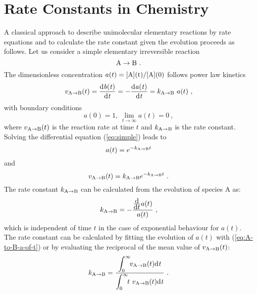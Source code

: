 \section{Rate Constants in Chemistry}

A classical approach to describe unimolecular elementary reactions by rate equations and to calculate the rate constant given the evolution proceeds as follows.
Let us consider a simple elementary irreversible reaction 
\begin{equation}
\label{eq:A-to-B}
{\centering
\rm A \rightarrow B} ~.
\end{equation}
The dimensionless concentration $a(t) = \rm[A](t) / \rm[A](0)$ follows power law kinetics
\begin{equation}
\label{eq:simple}
v_{\rm A \rightarrow B}(t) = \frac{\rm d \it b (t)}{\rm d \it t}
= - \frac{\rm d \it a (t)}{\rm d \it t} =  k_{\rm A \rightarrow B} ~ a(t) ~,
\end{equation}
with boundary conditions
\begin{equation}
a(0) = 1 , ~ \lim_{t \rightarrow \infty} a(t) = 0 ~,
\end{equation}
where $v_{\rm A \rightarrow B}(t)$ is the reaction rate at time $t$ and $k_{\rm A \rightarrow B}$ is the rate constant.
Solving the differential equation (\ref{eq:simple}) leads to 
\begin{equation}
\label{eq:A-to-B-a-of-t}
a(t) = e^{- k_{\rm A \rightarrow B} t}
\end{equation}
and 
\begin{equation}
\label{eq:v}
v_{\rm A \rightarrow B}(t) = k_{\rm A \rightarrow B} e^{- k_{\rm A \rightarrow B} t} ~.
\end{equation}
The rate constant $k_{\rm A \rightarrow B}$ can be calculated from the evolution of species A as:
\begin{equation}
\label{eq:diff-A-to-B}
k_{\rm A \rightarrow B} = 
- \frac{\frac{\displaystyle \rm d}{\displaystyle{{\rm d} t}} {\displaystyle{a(t)}}}{a(t)} ~,
\end{equation}
which is independent of time $t$ in the case of exponential behaviour for $a(t)$.
The rate constant can be calculated by fitting the evolution of $a(t)$ with (\ref{eq:A-to-B-a-of-t}) or by evaluating the reciprocal of the mean value of $v_{\rm A \rightarrow B}(t)$:
\begin{equation}
\label{eq:int-A-to-B}
k_{\rm A \rightarrow B} = \frac{\displaystyle{\int_0^{\infty}  \!\!  v_{\rm A \rightarrow B}(t) \rm d \it t}}
{\displaystyle{\int_0^{\infty} \!\! t ~ v_{\rm A \rightarrow B}(t) \rm d \it t}} ~.
\end{equation}

